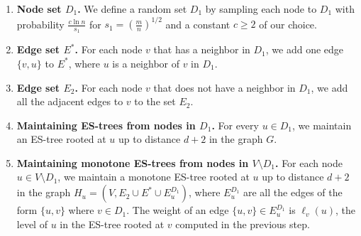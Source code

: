 \begin{enumerate}
    \item \textbf{Node set $D_1$.} We define a random set $D_1$ by sampling each node to $D_1$ with probability $\frac{c\ln{n}}{s_1}$ for $s_1= (\frac{m}{n})^{1/2}$ and a constant $c \geq 2$ of our choice.
    \item \textbf{Edge set $E^*$.} For each node $v$ that has a neighbor in $D_1$, we add one edge $\{v,u\}$ to $E^*$, where $u$ is a neighbor of $v$ in $D_1$.
    \item \textbf{Edge set $E_2$.} For each node $v$ that does not have a neighbor in $D_1$, we add all the adjacent edges to $v$ to the set $E_2$.
    \item \textbf{Maintaining ES-trees from nodes in $D_1$.} For every $u \in D_1$, we maintain an ES-tree rooted at $u$ up to distance $d+2$ in the graph $G$.
    \item \textbf{Maintaining monotone ES-trees from nodes in $V \setminus D_1$.} For each node $u \in V \setminus D_1$, we maintain a monotone ES-tree rooted at $u$ up to distance $d+2$ in the graph $H_u = (V,E_2 \cup E^* \cup E_u^{D_1})$, where $E_u^{D_1}$ are all the edges of the form $\{u,v\}$ where $v \in D_1$. The weight of an edge $\{u,v\} \in E_u^{D_1}$ is $\ell_v(u)$, the level of $u$ in the ES-tree rooted at $v$ computed in the previous step.
\end{enumerate}


